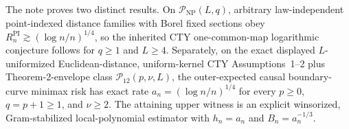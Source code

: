 The note proves two distinct results.  On \(\mathcal P_{\mathrm{NP}}(L,q)\), arbitrary law-independent point-indexed distance families with Borel fixed sections obey \(R_n^{\mathrm{PI}}\gtrsim(\log n/n)^{1/4}\), so the inherited CTY one-common-map logarithmic conjecture follows for \(q\geq1\) and \(L\geq4\).  Separately, on the exact displayed \(L\)-uniformized Euclidean-distance, uniform-kernel CTY Assumptions~1--2 plus Theorem-2-envelope class \(\mathcal P_{12}(p,\nu,L)\), the outer-expected causal boundary-curve minimax risk has exact rate \(a_n=(\log n/n)^{1/4}\) for every \(p\geq0\), \(q=p+1\geq1\), and \(\nu\geq2\).  The attaining upper witness is an explicit winsorized, Gram-stabilized local-polynomial estimator with \(h_n=a_n\) and \(B_n=a_n^{-1/3}\).
